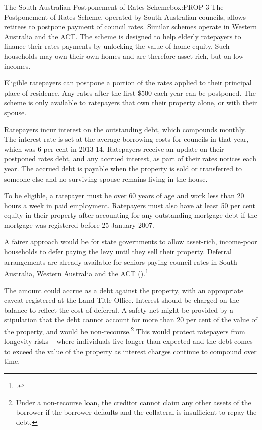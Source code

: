 \begin{smallbox}{The South Australian Postponement of Rates Scheme}{box:PROP-3}
The Postponement of Rates Scheme, operated by South Australian councils, allows retirees to postpone payment of council rates. Similar schemes operate in Western Australia and the ACT\@. The scheme is designed to help elderly ratepayers to finance their rates payments by unlocking the value of home equity. Such households may own their own homes and are therefore asset-rich, but on low incomes.

Eligible ratepayers can postpone a portion of the rates applied to their principal place of residence. Any rates after the first \$500 each year can be postponed. The scheme is only available to ratepayers that own their property alone, or with their spouse.

Ratepayers incur interest on the outstanding debt, which compounds monthly. The interest rate is set at the average borrowing costs for councils in that year, which was 6 per cent in 2013-14. Ratepayers receive an update on their postponed rates debt, and any accrued interest, as part of their rates notices each year. The accrued debt is payable when the property is sold or transferred to someone else and no surviving spouse remains living in the house. 

To be eligible, a ratepayer must be over 60 years of age and work less than 20 hours a week in paid employment. Ratepayers must also have at least 50 per cent equity in their property after accounting for any outstanding mortgage debt if the mortgage was registered before 25 January 2007. 
\end{smallbox} 

A fairer approach would be for state governments to allow asset-rich, income-poor households to defer paying the levy until they sell their property. Deferral arrangements are already available for seniors paying council rates in South Australia, Western Australia and the ACT ().\footcite{Brownfield2014} 

The amount could accrue as a debt against the property, with an appropriate caveat registered at the Land Title Office. Interest should be charged on the balance to reflect the cost of deferral. A safety net might be provided by a stipulation that the debt cannot account for more than 20 per cent of the value of the property, and would be non-recourse.\footnote{Under a non-recourse loan, the creditor cannot claim any other assets of the borrower if the borrower defaults and the collateral is insufficient to repay the debt.}  This would protect ratepayers from longevity risks – where individuals live longer than expected and the debt comes to exceed the value of the property as interest charges continue to compound over time. 

